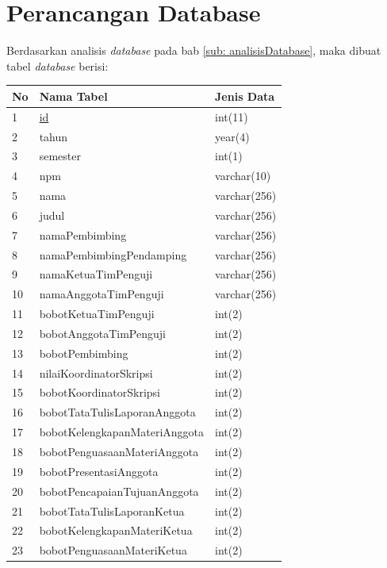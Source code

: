 	\section{Perancangan Database}
	\label{sec: perancanganDatabase}
	
	Berdasarkan analisis \textit{database} pada bab \ref{sub: analisisDatabase}, maka dibuat tabel \textit{database} berisi:
	
	\begin{tabular}{| m{0.75cm} | m{7cm} | m{3cm} |}
		\hline
		No & Nama Tabel & Jenis Data\\
		\hline
		1 & \underline{id} & int(11)\\
		\hline
		2 & tahun & year(4)\\
		\hline
		3 & semester & int(1)\\
		\hline
		4 & npm & varchar(10)\\
		\hline
		5 & nama & varchar(256)\\
		\hline
		6 & judul & varchar(256)\\
		\hline
		7 & namaPembimbing & varchar(256)\\
		\hline
		8 & namaPembimbingPendamping & varchar(256)\\
		\hline
		9 & namaKetuaTimPenguji & varchar(256)\\
		\hline
		10 & namaAnggotaTimPenguji & varchar(256)\\
		\hline
		11 & bobotKetuaTimPenguji & int(2)\\
		\hline
		12 & bobotAnggotaTimPenguji & int(2)\\
		\hline
		13 & bobotPembimbing & int(2)\\
		\hline
		14 & nilaiKoordinatorSkripsi & int(2)\\
		\hline
		15 & bobotKoordinatorSkripsi & int(2)\\
		\hline
		16 & bobotTataTulisLaporanAnggota & int(2)\\
		\hline
		17 & bobotKelengkapanMateriAnggota & int(2)\\
		\hline
		18 & bobotPenguasaanMateriAnggota & int(2)\\
		\hline
		19 & bobotPresentasiAnggota & int(2)\\
		\hline
		20 & bobotPencapaianTujuanAnggota & int(2)\\
		\hline
		21 & bobotTataTulisLaporanKetua & int(2)\\
		\hline
		22 & bobotKelengkapanMateriKetua & int(2)\\
		\hline
		23 & bobotPenguasaanMateriKetua & int(2)\\

\end{tabular}
